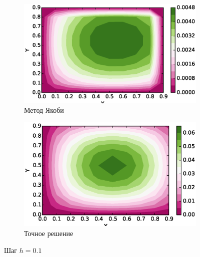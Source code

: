 \documentclass[12pt,a4paper]{article}
\begin{document}
\begin{figure}
	\centering
	\begin{subfigure}{\textwidth}
		\includegraphics{1_u.eps}
		\caption{Метод Якоби}\label{fig:u0.1}
	\end{subfigure}
	\begin{subfigure}{\textwidth}
		\includegraphics{1_exact.eps}
		\caption{Точное решение}\label{fig:e0.1}
	\end{subfigure}
	\caption{Шаг $h=0.1$}\label{fig:e0.1}
\end{figure}
\end{document}
